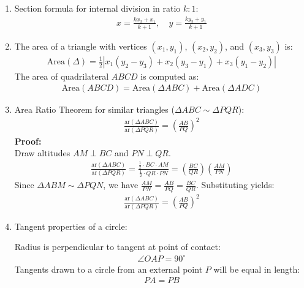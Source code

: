\begin{enumerate}[label=\thesubsection.\arabic*, ref=\thesubsection.\theenumi]
    \item Section formula for internal division in ratio $k : 1$:
\begin{align}
    x = \frac{k x_2 + x_1}{k + 1}, \quad y = \frac{k y_2 + y_1}{k + 1} \label{eq:EE26BTECH11225-section}
\end{align}

    \item The area of a triangle with vertices $(x_1, y_1)$, $(x_2, y_2)$, and $(x_3, y_3)$ is:
\begin{align}
    \text{Area}(\Delta) = \frac{1}{2} |x_1(y_2 - y_3) + x_2(y_3 - y_1) + x_3(y_1 - y_2)| \label{eq:EE26BTECH11225-area-triangle}
\end{align}
The area of quadrilateral $ABCD$ is computed as:
\begin{align}
    \text{Area}(ABCD) = \text{Area}(\Delta ABC) + \text{Area}(\Delta ADC) \label{eq:EE26BTECH11225-area-quad}
\end{align}

    \item Area Ratio Theorem for similar triangles ($\Delta ABC \sim \Delta PQR$):
\begin{align}
    \frac{\text{ar}(\Delta ABC)}{\text{ar}(\Delta PQR)} = \left(\frac{AB}{PQ}\right)^2 \label{eq:EE26BTECH11225-area-ratio}
\end{align}
\textbf{Proof:} \\
Draw altitudes $AM \perp BC$ and $PN \perp QR$.
\begin{align}
    \frac{\text{ar}(\Delta ABC)}{\text{ar}(\Delta PQR)} = \frac{\frac{1}{2} \cdot BC \cdot AM}{\frac{1}{2} \cdot QR \cdot PN} = \left(\frac{BC}{QR}\right) \left(\frac{AM}{PN}\right) \nonumber
\end{align}
Since $\Delta ABM \sim \Delta PQN$, we have $\frac{AM}{PN} = \frac{AB}{PQ} = \frac{BC}{QR}$. Substituting yields:
\begin{align}
    \frac{\text{ar}(\Delta ABC)}{\text{ar}(\Delta PQR)} = \left(\frac{AB}{PQ}\right)^2 \nonumber
\end{align}

    \item Tangent properties of a circle:
    \begin{center}
    
    \end{center}
    Radius is perpendicular to tangent at point of contact:
\begin{align}
    \angle OAP = 90^\circ \label{eq:EE26BTECH11225-tangent-perp}
\end{align}
    Tangents drawn to a circle from an external point $P$ will be equal in length:
\begin{align}
    PA = PB \label{eq:EE26BTECH11225-tangent-equal}
\end{align}


\end{enumerate}
